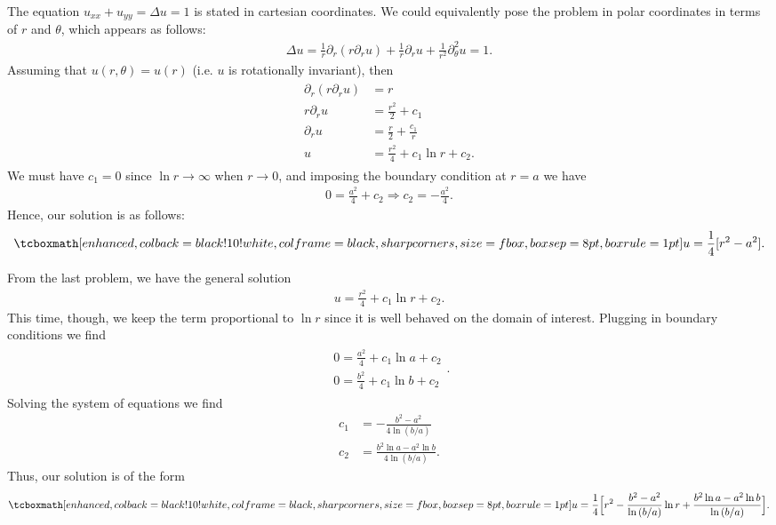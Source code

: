 The equation $u_{xx} + u_{yy} = \Delta u = 1$ is stated in cartesian coordinates.
We could equivalently pose the problem in polar coordinates in terms of $r$ and $\theta$, which appears as follows:
\begin{eqnarray}
    \label{eq:equiv-polar}
    \Delta u = \frac{1}{r}\partial_{r}(r\partial_{r} u) + \frac{1}{r}\partial_{r} u + \frac{1}{r^2}\partial_{\theta}^2 u = 1
.\end{eqnarray}
Assuming that $u(r,\theta)=u(r)$ (i.e. $u$ is rotationally invariant), then
\begin{eqnarray}
\label{eq:solve-eq}
\begin{aligned}
    \partial_{r}(r\partial_{r} u) &= r \\
    r\partial_{r} u &= \frac{r^2}{2} + c_{1} \\
    \partial_{r}u &= \frac{r}{2} + \frac{c_1}{r} \\
    u &= \frac{r^2}{4} + c_1 \ln{r} + c_2
.\end{aligned}
\end{eqnarray}
We must have $c_1 = 0$ since $\ln{r} \rightarrow \infty$ when $r \rightarrow 0$,
and imposing the boundary condition at $r = a$ we have
\begin{eqnarray}
    \label{eq:bound-cond}
    0 = \frac{a^2}{4} + c_2 \Rightarrow c_2 = - \frac{a^2}{4} 
.\end{eqnarray}
Hence, our solution is as follows:
\begin{eqnarray}
    \label{eq:sol-6.1.5}
    \eqbox{
    u = \frac{1}{4}[r^2 - a^2] 
}
.\end{eqnarray}



From the last problem, we have the general solution 
\begin{eqnarray}
    \label{eq:gen-sol-u}
    u = \frac{r^2}{4} + c_1\ln{r} + c_2 
.\end{eqnarray}
This time, though, we keep the term proportional to $\ln{r}$ since it is well behaved on the domain of interest.
Plugging in boundary conditions we find
\begin{eqnarray}
    \label{eq:bound-cond-a-b}
    \begin{aligned}
        0 = \frac{a^2}{4} + c_1\ln{a} + c_2 \\
        0 = \frac{b^2}{4} + c_1\ln{b} + c_2
    \end{aligned}
.\end{eqnarray}
Solving the system of equations we find
\begin{align}
    \label{eq:sol-c1-c2}
    c_1 &= -\frac{b^2 - a^2}{4\ln{(b/a)}} \\
    c_2 &= \frac{b^2\ln{a} - a^2\ln{b}}{4\ln{(b/a)}}
.\end{align}
Thus, our solution is of the form
\begin{eqnarray}
    \label{eq:sol-u}
    \eqbox{
    u = \frac{1}{4} \Big[ r^2 - \frac{b^2 - a^2}{\ln{(b/a)}}\ln{r} + \frac{b^2\ln{a} - a^2\ln{b}}{\ln{(b/a)}} \Big]
}
.\end{eqnarray}


